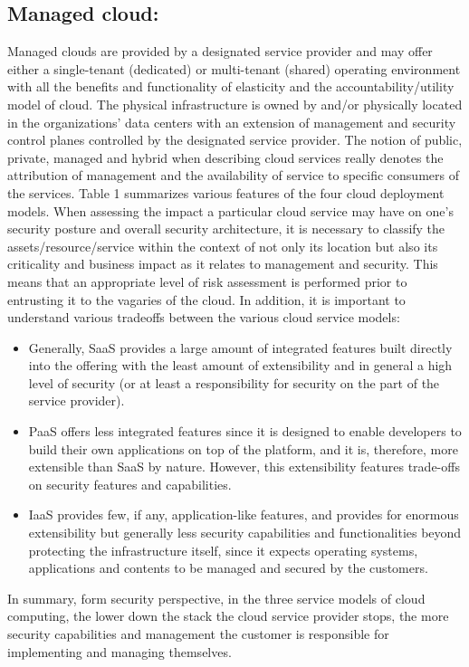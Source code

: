 \documentclass[11pt,a4paper]{report}
\begin{document}
 \subsection{Managed cloud:}
Managed clouds are provided by a designated service provider and may offer either a
single-tenant (dedicated) or multi-tenant (shared) operating environment with all the benefits and
functionality of elasticity and the accountability/utility model of cloud. The physical infrastructure is
owned by and/or physically located in the organizations’ data centers with an extension of management
and security control planes controlled by the designated service provider.
The notion of public, private, managed and hybrid when describing cloud services really denotes the
attribution of management and the availability of service to specific consumers of the services. Table 1
summarizes various features of the four cloud deployment models.
When assessing the impact a particular cloud service may have on one’s security posture and overall
security architecture, it is necessary to classify the assets/resource/service within the context of not only
its location but also its criticality and business impact as it relates to management and security. This
means that an appropriate level of risk assessment is performed prior to entrusting it to the vagaries of the
cloud. In addition, it is important to understand various tradeoffs between
the various cloud service models:

\begin{itemize}
\item Generally, SaaS provides a large amount of integrated features built directly into the offering with
the least amount of extensibility and in general a high level of security (or at least a responsibility
for security on the part of the service provider).
\item PaaS offers less integrated features since it is designed to enable developers to build their own
applications on top of the platform, and it is, therefore, more extensible than SaaS by nature.
However, this extensibility features trade-offs on security features and capabilities.
\item IaaS provides few, if any, application-like features, and provides for enormous extensibility but
generally less security capabilities and functionalities beyond protecting the infrastructure itself,
since it expects operating systems, applications and contents to be managed and secured by the
customers.
\end{itemize}
In summary, form security perspective, in the three service models of cloud computing, the lower
down the stack the cloud service provider stops, the more security capabilities and management the
customer is responsible for implementing and managing themselves.
\end{document}
